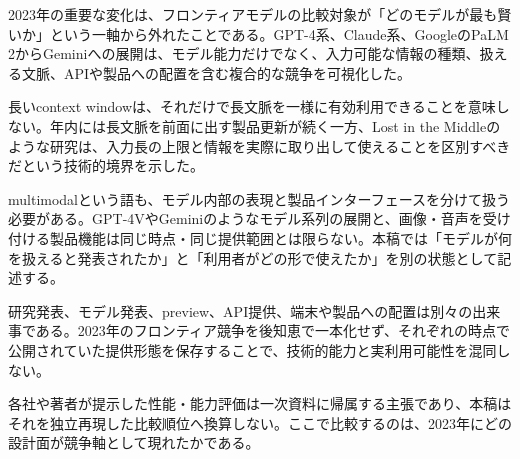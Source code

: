 
2023年の重要な変化は、フロンティアモデルの比較対象が「どのモデルが最も賢いか」という一軸から外れたことである。GPT-4系、Claude系、GoogleのPaLM 2からGeminiへの展開は、モデル能力だけでなく、入力可能な情報の種類、扱える文脈、APIや製品への配置を含む複合的な競争を可視化した。\autocite{src-013fa77665db,src-3375c5d27d9b,src-39071a9443e5,src-5bfa9c93d034,src-93d355bf8806,src-a3dead6cff65,src-a95452783369,src-b1525886b462,src-db671ee1d1b8,src-e116708067ab,src-f5041642fb21,src-f951bda6a0f4,src-fd9cb9c0061f}


長いcontext windowは、それだけで長文脈を一様に有効利用できることを意味しない。年内には長文脈を前面に出す製品更新が続く一方、Lost in the Middleのような研究は、入力長の上限と情報を実際に取り出して使えることを区別すべきだという技術的境界を示した。\autocite{src-013fa77665db,src-2b6af707f3ef,src-39071a9443e5,src-93d355bf8806,src-a3dead6cff65,src-b1525886b462,src-db671ee1d1b8,src-f5041642fb21,src-fd9cb9c0061f}


multimodalという語も、モデル内部の表現と製品インターフェースを分けて扱う必要がある。GPT-4VやGeminiのようなモデル系列の展開と、画像・音声を受け付ける製品機能は同じ時点・同じ提供範囲とは限らない。本稿では「モデルが何を扱えると発表されたか」と「利用者がどの形で使えたか」を別の状態として記述する。\autocite{src-3375c5d27d9b,src-5bfa9c93d034,src-93d355bf8806,src-a3dead6cff65,src-a95452783369,src-db671ee1d1b8,src-f951bda6a0f4,src-fd9cb9c0061f}


研究発表、モデル発表、preview、API提供、端末や製品への配置は別々の出来事である。2023年のフロンティア競争を後知恵で一本化せず、それぞれの時点で公開されていた提供形態を保存することで、技術的能力と実利用可能性を混同しない。\autocite{src-013fa77665db,src-3375c5d27d9b,src-39071a9443e5,src-5bfa9c93d034,src-93d355bf8806,src-a3dead6cff65,src-a95452783369,src-b1525886b462,src-db671ee1d1b8,src-e116708067ab,src-f5041642fb21,src-f951bda6a0f4,src-fd9cb9c0061f}


\begin{claimboundary}
各社や著者が提示した性能・能力評価は一次資料に帰属する主張であり、本稿はそれを独立再現した比較順位へ換算しない。ここで比較するのは、2023年にどの設計面が競争軸として現れたかである。\autocite{src-3375c5d27d9b,src-5bfa9c93d034,src-a95452783369,src-f951bda6a0f4}
\end{claimboundary}
